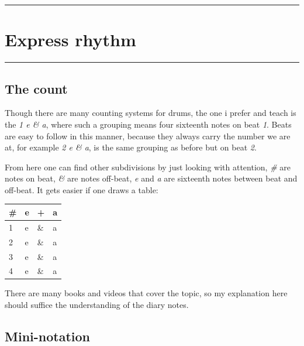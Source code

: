 \documentclass[
]{book}
\begin{document}
\hypertarget{okt112022}{}

\begin{center}\rule{0.5\linewidth}{0.5pt}\end{center}

\hypertarget{Express-rhythm}{%
\chapter{Express rhythm}\label{Express-rhythm}}

\begin{center}\rule{0.5\linewidth}{0.5pt}\end{center}

\hypertarget{the-count}{%
\section*{The count}\label{the-count}}

Though there are many counting systems for drums, the one i prefer and teach is the \emph{1 e \& a}, where such a grouping means four sixteenth notes on beat \emph{1}. Beats are easy to follow in this manner, because they always carry the number we are at, for example \emph{2 e \& a}, is the same grouping as before but on beat \emph{2}.

From here one can find other subdivisions by just looking with attention, \emph{\#} are notes on beat, \emph{\&} are notes off-beat, \emph{e} and \emph{a} are sixteenth notes between beat and off-beat. It gets easier if one draws a table:

\begin{longtable}[]{@{}llll@{}}
\toprule
\# & e & + & a \\
\midrule
\endhead
1 & e & \& & a \\
2 & e & \& & a \\
3 & e & \& & a \\
4 & e & \& & a \\
\bottomrule
\end{longtable}

There are many books and videos that cover the topic, so my explanation here should suffice the understanding of the diary notes.

\hypertarget{mini-notation}{%
\section*{Mini-notation}\label{mini-notation}}
\end{document}
